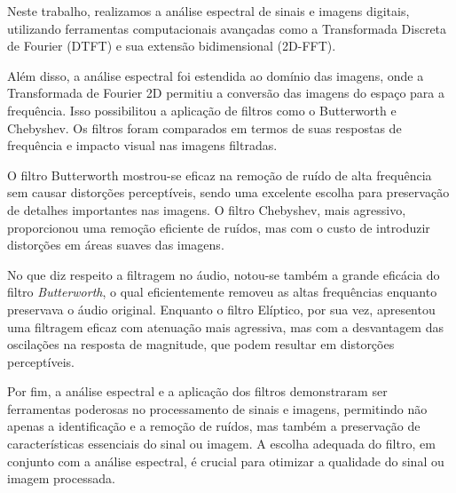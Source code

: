 Neste trabalho, realizamos a análise espectral de sinais e imagens digitais, utilizando ferramentas computacionais avançadas como a Transformada Discreta de Fourier (DTFT) e sua extensão bidimensional (2D-FFT).

Além disso, a análise espectral foi estendida ao domínio das imagens, onde a Transformada de Fourier 2D permitiu a conversão das imagens do espaço para a frequência. Isso possibilitou a aplicação de filtros como o Butterworth e Chebyshev. Os filtros foram comparados em termos de suas respostas de frequência e impacto visual nas imagens filtradas.

O filtro Butterworth mostrou-se eficaz na remoção de ruído de alta frequência sem causar distorções perceptíveis, sendo uma excelente escolha para preservação de detalhes importantes nas imagens. O filtro Chebyshev, mais agressivo, proporcionou uma remoção eficiente de ruídos, mas com o custo de introduzir distorções em áreas suaves das imagens.

No que diz respeito a filtragem no áudio, notou-se também a grande eficácia do filtro \textit{Butterworth}, o qual eficientemente removeu as altas frequências enquanto preservava o áudio original. Enquanto o filtro Elíptico, por sua vez, apresentou uma filtragem eficaz com atenuação mais agressiva, mas com a desvantagem das oscilações na resposta de magnitude, que podem resultar em distorções perceptíveis.

Por fim, a análise espectral e a aplicação dos filtros demonstraram ser ferramentas poderosas no processamento de sinais e imagens, permitindo não apenas a identificação e a remoção de ruídos, mas também a preservação de características essenciais do sinal ou imagem. A escolha adequada do filtro, em conjunto com a análise espectral, é crucial para otimizar a qualidade do sinal ou imagem processada.
